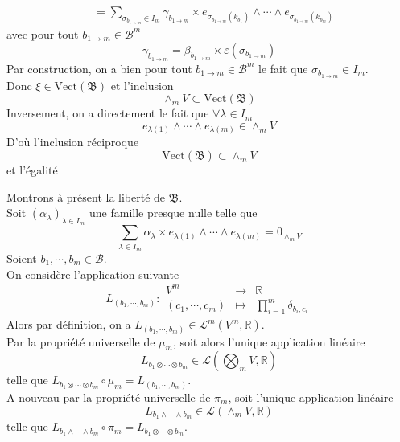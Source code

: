 \documentclass[../geometrie.tex]{subfiles}
\begin{document}
{{\begin{mathlist}
$$\begin{aligned}
							& = \sum_{\sigma_{b_{1 \to m}} \in I_{m}} \gamma_{b_{1 \to m}} \times e_{\sigma_{b_{1 \to m}}(k_{b_{1}})} \wedge \cdots \wedge e_{\sigma_{b_{1 \to m}}(k_{b_{m}})}
						\end{aligned}
					$$
					avec pour tout $b_{1 \to m} \in \mathcal{B}^{m}$
					$$
						\gamma_{b_{1 \to m}} = \beta_{b_{1 \to m}} \times \varepsilon(\sigma_{b_{1 \to m}})
					$$
					Par construction, on a bien pour tout $b_{1 \to m} \in \mathcal{B}^{m}$ le fait que $\sigma_{b_{1 \to m}} \in I_{m}$. \\
					Donc $\xi \in \mathrm{Vect}(\mathfrak{B})$ et l'inclusion
					$$
						\wedge_{m} V \subset \mathrm{Vect}(\mathfrak{B})
					$$
					Inversement, on a directement le fait que $\forall \lambda \in I_{m}$
					$$
						e_{\lambda(1)} \wedge \cdots \wedge e_{\lambda(m)} \in \wedge_{m} V
					$$
					D'où l'inclusion réciproque
					$$
						\mathrm{Vect}(\mathfrak{B}) \subset \wedge_{m} V
					$$
					et l'égalité
				\item Montrons à présent la liberté de $\mathfrak{B}$. \\
					Soit $(\alpha_{\lambda})_{\lambda \in I_{m}}$ une famille presque nulle telle que
					$$
						\sum_{\lambda \in I_{m}} \alpha_{\lambda} \times e_{\lambda(1)} \wedge \cdots \wedge e_{\lambda(m)} = 0_{\wedge_{m} V}
					$$
					Soient $b_{1}, \cdots, b_{m} \in \mathcal{B}$. \\
					On considère l'application suivante
					$$
						L_{(b_{1}, \cdots, b_{m})} :
						\begin{array}{rcl}
							V^{m} & \longrightarrow & \mathbb{R} \\
							(c_{1}, \cdots, c_{m}) & \longmapsto & \displaystyle \prod_{i = 1}^{m} \delta_{b_{i}, c_{i}}
						\end{array}
					$$
					Alors par définition, on a $L_{(b_{1}, \cdots, b_{m})} \in \mathcal{L}^{m}(V^{m}, \mathbb{R})$. \\
					Par la propriété universelle de $\mu_{m}$, soit alors l'unique application linéaire
					$$
						L_{b_{1} \otimes \cdots \otimes b_{m}} \in \mathcal{L} \! \left(\bigotimes_{m} V, \mathbb{R}\right)
					$$
					telle que $L_{b_{1} \otimes \cdots \otimes b_{m}} \circ \mu_{m} = L_{(b_{1}, \cdots, b_{m})}$. \\
					A nouveau par la propriété universelle de $\pi_{m}$, soit l'unique application linéaire
					$$
						L_{b_{1} \wedge \cdots \wedge b_{m}} \in \mathcal{L}(\wedge_{m} V, \mathbb{R})
					$$
					telle que $L_{b_{1} \wedge \cdots \wedge b_{m}} \circ \pi_{m} = L_{b_{1} \otimes \cdots \otimes b_{m}}$. \\

\end{mathlist}}}
\end{document}
